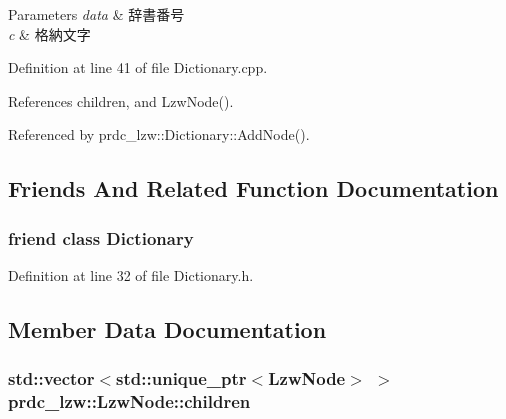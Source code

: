 \begin{DoxyParams}{Parameters}
{\em data} & 辞書番号 \\
\hline
{\em c} & 格納文字 \\
\hline
\end{DoxyParams}


Definition at line 41 of file Dictionary.\-cpp.



References children, and Lzw\-Node().



Referenced by prdc\-\_\-lzw\-::\-Dictionary\-::\-Add\-Node().



\subsection{Friends And Related Function Documentation}
\hypertarget{classprdc__lzw_1_1LzwNode_a61780a02d5e0994eb40a4b79f9c007ad}{
\subsubsection[{Dictionary}]{\setlength{\rightskip}{0pt plus 5cm}friend class {\bf Dictionary}\hspace{0.3cm}{\ttfamily [friend]}}}\label{classprdc__lzw_1_1LzwNode_a61780a02d5e0994eb40a4b79f9c007ad}


Definition at line 32 of file Dictionary.\-h.



\subsection{Member Data Documentation}
\hypertarget{classprdc__lzw_1_1LzwNode_aa2a491ab33b89986e6086bdf0e48a4d3}{
\subsubsection[{children}]{\setlength{\rightskip}{0pt plus 5cm}std\-::vector$<$std\-::unique\-\_\-ptr$<${\bf Lzw\-Node}$>$ $>$ prdc\-\_\-lzw\-::\-Lzw\-Node\-::children}}\label{classprdc__lzw_1_1LzwNode_aa2a491ab33b89986e6086bdf0e48a4d3}


